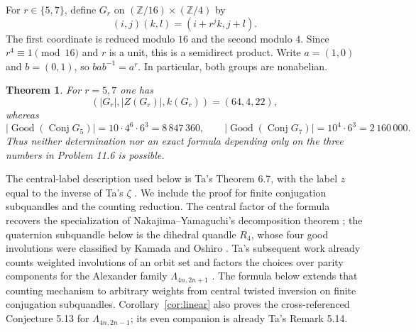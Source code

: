 \documentclass[11pt]{article}
\newtheorem{theorem}{Theorem}
\newcommand{\Good}{\operatorname{Good}}
\newcommand{\Conj}{\operatorname{Conj}}
\begin{document}
For $r\in\{5,7\}$, define $G_r$ on
$(\mathbb Z/16)\times(\mathbb Z/4)$ by
\begin{equation}\label{eq:product}
 (i,j)(k,l)=(i+r^j k,j+l).
\end{equation}
The first coordinate is reduced modulo $16$ and the second modulo $4$.
Since $r^4\equiv1\pmod {16}$ and $r$ is a unit, this is a semidirect product.
Write $a=(1,0)$ and $b=(0,1)$, so $bab^{-1}=a^r$.
In particular, both groups are nonabelian.

\begin{samepage}
\begin{theorem}\label{thm:main}
For $r=5,7$ one has
\[
 (|G_r|,|Z(G_r)|,k(G_r))=(64,4,22),
\]
whereas
\[
 |\Good(\Conj G_5)|=10\cdot4^6\cdot6^3=8\,847\,360,
 \qquad
 |\Good(\Conj G_7)|=10^4\cdot6^3=2\,160\,000.
\]
Thus neither determination nor an exact formula depending only on the
three numbers in Problem 11.6 is possible.
\end{theorem}
\end{samepage}

The central-label description used below is Ta's Theorem 6.7, with the
label $z$ equal to the inverse of Ta's $\zeta$ \cite[pp.~13--14]{Ta}.
We include the proof for finite conjugation subquandles and the counting
reduction. The central factor of the formula recovers the specialization
of Nakajima--Yamaguchi's decomposition theorem
\cite[Theorems 1.1 and 3.3]{NY}; the quaternion subquandle below is
the dihedral quandle $R_4$, whose four good involutions were classified
by Kamada and Oshiro \cite[Theorem 3.2(3)]{KO}.
Ta's subsequent work already counts weighted involutions of an orbit set
and factors the choices over parity components for the Alexander family
$\Lambda_{4n,2n+1}$ \cite[Lemma 5.10 and Theorem 5.11, pp.~15--16]{TaTwisted}.
The formula below extends that counting mechanism to arbitrary weights
from central twisted inversion on finite conjugation subquandles.
Corollary~\ref{cor:linear} also proves the cross-referenced Conjecture 5.13
for $\Lambda_{4n,2n-1}$; its even companion is already Ta's Remark 5.14.
\end{document}
